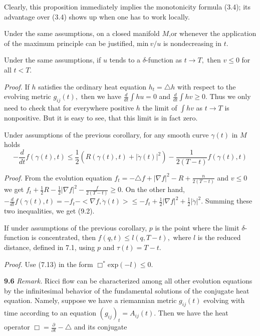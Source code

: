 \documentclass[12pt]{article}
\theoremstyle{plain}
{\swapnumbers
\newtheorem{thm}{Theorem}[section]
\newtheorem{cor}[thm]{Corollary}
\newtheorem{lem}[thm]{Lemma}
\newtheorem{prop}[thm]{Proposition}
}
\theoremstyle{definition}
{\swapnumbers
\newtheorem{defn}[thm]{Definition}
\newtheorem{nota}[thm]{Notation}
\newtheorem{parag}[thm]{}
\newtheorem*{parstr}{\addtocounter{thm}{1}\thesection.\arabic{thm}*}
\newtheorem*{intropar}{\addtocounter{thm}{1}\arabic{thm}}
}
\theoremstyle{remark} {\swapnumbers
\newtheorem{rem}[thm]{Remark}
\newtheorem{exam}[thm]{Example}
\newtheorem{lemma}[thm]{Lemma}
\newtheorem{claim}[thm]{Claim}
}
\numberwithin{equation}{section}
\begin{document}
 Clearly, this proposition immediately implies the monotonicity
 formula (3.4); its advantage over (3.4) shows up when one has to
 work locally.
 \begin{cor} Under the same assumptions, on a closed manifold $M$,or whenever the
 application of the maximum principle can be justified, $\mbox{min}\ v/u$ is
 nondecreasing in $t.$ \end{cor}\begin{cor} Under the same
 assumptions, if $u$ tends to a $\delta$-function as $t\to T,$ then
 $v\le 0 $ for all $t<T.$\end{cor} {\it Proof.}  If $h$ satisfies the
 ordinary heat equation $h_t=\triangle h$ with respect to the
 evolving metric $g_{ij}(t),$ then we have
 $\frac{d}{dt}\int{hu}=0$ and $\frac{d}{dt}\int{hv}\ge 0.$ Thus we
 only need to check that for everywhere positive $h$ the limit of
 $\int{hv}$ as $t\to T$ is nonpositive. But it is easy to see,
 that this limit is in fact zero. \begin{cor}  Under
 assumptions of the previous corollary, for any smooth curve
 $\gamma(t)$ in $M$ holds \begin{equation}
 -\frac{d}{dt}f(\gamma(t),t)\le\frac{1}{2}(R(\gamma(t),t)+|\dot{\gamma}(t)|^2)
 -\frac{1}{2(T-t)}f(\gamma(t),t) \end{equation} \end{cor}{\it Proof.}  From the evolution
 equation $f_t=-\triangle f+|\nabla f|^2-R+\frac{n}{2(T-t)}$ and
 $v\le 0$ we get $f_t+\frac{1}{2}R-\frac{1}{2}|\nabla
 f|^2-\frac{f}{2(T-t)}\ge 0.$ On the other hand,$
 -\frac{d}{dt}f(\gamma(t),t)=-f_t-<\nabla f,\dot{\gamma}(t)>\le
 -f_t+\frac{1}{2}|\nabla f|^2+\frac{1}{2}|\dot{\gamma}|^2.$
 Summing these two inequalities, we get (9.2).
 \begin{cor}
 If under assumptions of the previous corollary, $p$ is the point
 where the limit $\delta$-function is concentrated, then
 $f(q,t)\le l(q,T-t),$ where $l$ is the reduced distance, defined
 in 7.1, using $p$ and $\tau(t)=T-t.$ \end{cor}{\it Proof.} Use (7.13) in
 the form $\Box^*\mbox{exp}(-l)\le 0.$ \par {\bf 9.6} {\it Remark.} Ricci flow can be
 characterized among all other evolution equations by the
 infinitesimal behavior of the fundamental solutions of the
 conjugate heat equation. Namely, suppose we have a riemannian
 metric $g_{ij}(t)$ evolving with time according to an equation
 $(g_{ij})_t=A_{ij}(t).$ Then we have the heat operator
 $\Box=\frac{\partial}{\partial t}-\triangle$ and its conjugate
\end{document}
